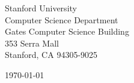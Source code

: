 \begin{minipage}{0.49\textwidth}
\begin{flushleft}
\noindent
Stanford University\\
Computer Science Department\\
Gates Computer Science Building\\
353 Serra Mall\\
Stanford, CA 94305-9025
\end{flushleft}
\end{minipage}
\begin{minipage}{0.47\textwidth}
\begin{flushright}
\today
\end{flushright}
\end{minipage} \\

\newcommand{\univ}{Stanford University}
\newcommand{\univshort}{Stanford}
\newcommand{\degree}{Ph.D.}
\newcommand{\dept}{Computer Science}
